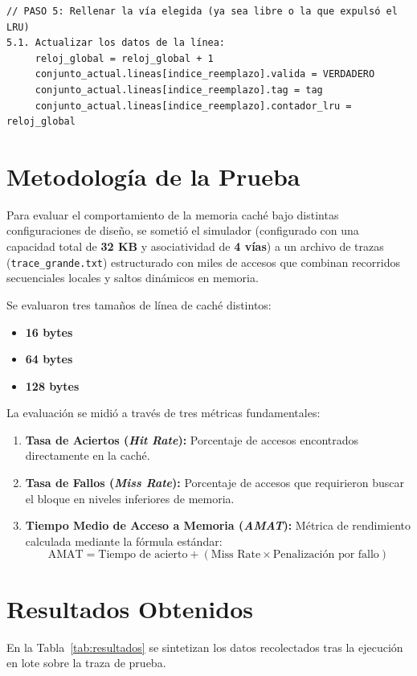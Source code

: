 \documentclass[12pt,a4paper]{article}
\begin{document}
\begin{verbatim}
// PASO 5: Rellenar la vía elegida (ya sea libre o la que expulsó el LRU)
5.1. Actualizar los datos de la línea:      
     reloj_global = reloj_global + 1      
     conjunto_actual.lineas[indice_reemplazo].valida = VERDADERO      
     conjunto_actual.lineas[indice_reemplazo].tag = tag      
     conjunto_actual.lineas[indice_reemplazo].contador_lru = reloj_global
\end{verbatim}

\section{Metodología de la Prueba}
Para evaluar el comportamiento de la memoria caché bajo distintas configuraciones de diseño, se sometió el simulador (configurado con una capacidad total de \textbf{32 KB} y asociatividad de \textbf{4 vías}) a un archivo de trazas (\texttt{trace\_grande.txt}) estructurado con miles de accesos que combinan recorridos secuenciales locales y saltos dinámicos en memoria.

Se evaluaron tres tamaños de línea de caché distintos:
\begin{itemize}
    \item \textbf{16 bytes}
    \item \textbf{64 bytes}
    \item \textbf{128 bytes}
\end{itemize}

La evaluación se midió a través de tres métricas fundamentales:
\begin{enumerate}
    \item \textbf{Tasa de Aciertos (\textit{Hit Rate}):} Porcentaje de accesos encontrados directamente en la caché.
    \item \textbf{Tasa de Fallos (\textit{Miss Rate}):} Porcentaje de accesos que requirieron buscar el bloque en niveles inferiores de memoria.
    \item \textbf{Tiempo Medio de Acceso a Memoria (\textit{AMAT}):} Métrica de rendimiento calculada mediante la fórmula estándar:
    \[
    \text{AMAT} = \text{Tiempo de acierto} + (\text{Miss Rate} \times \text{Penalización por fallo})
    \]
\end{enumerate}

\section{Resultados Obtenidos}
En la Tabla~\ref{tab:resultados} se sintetizan los datos recolectados tras la ejecución en lote sobre la traza de prueba.
\end{document}

